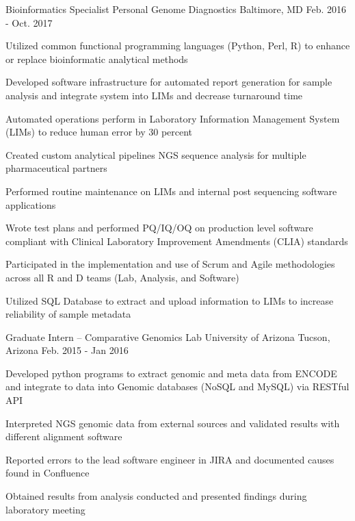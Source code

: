 \begin{cventries}
  \cventry
    {Bioinformatics Specialist} %
    {Personal Genome Diagnostics} %
    {Baltimore, MD} %
    {Feb. 2016 - Oct. 2017} %
    {
      \begin{cvitems} %
        \item{Utilized common functional programming languages (Python, Perl, R) to enhance or replace bioinformatic analytical methods}
        \item{Developed software infrastructure for automated report generation for sample analysis and integrate system into LIMs and decrease turnaround time}
        \item{Automated operations perform in Laboratory Information Management System (LIMs) to reduce human error by 30 percent}
        \item{Created custom analytical pipelines NGS sequence analysis for multiple pharmaceutical partners}
        \item{Performed routine maintenance on LIMs and internal post sequencing software applications}
        \item{Wrote test plans and performed PQ/IQ/OQ on production level software compliant with Clinical Laboratory Improvement Amendments (CLIA) standards}
        \item{Participated in the implementation and use of Scrum and Agile methodologies across all R and D teams (Lab, Analysis, and Software) }
        \item{Utilized SQL Database to extract and upload information to LIMs to increase reliability of sample metadata}
      \end{cvitems}
    }

  \cventry
    {Graduate Intern – Comparative Genomics Lab} %
    {University of Arizona} %
    {Tucson, Arizona} %
    {Feb. 2015 - Jan 2016} %
    {
      \begin{cvitems} %
        \item{Developed python programs to extract genomic and meta data from ENCODE and integrate to data into Genomic databases (NoSQL and MySQL) via RESTful API}
        \item{Interpreted NGS genomic data from external sources and validated results with different alignment software}
        \item{Reported errors to the lead software engineer in JIRA and documented causes found in Confluence}
        \item{Obtained results from analysis conducted and presented findings during laboratory meeting}
      \end{cvitems}
    }


\end{cventries}
